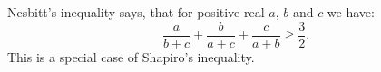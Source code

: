 \documentclass[12pt]{article}
\begin{document}
Nesbitt's inequality says, that for positive real $a$, $b$ and $c$ we have:
$$\frac{a}{b+c}+\frac{b}{a+c}+\frac{c}{a+b}\geq\frac{3}{2}.$$
This is a special case of Shapiro's inequality.
\end{document}

